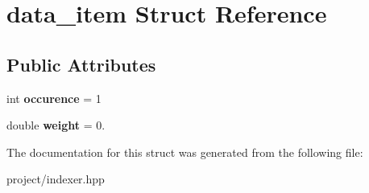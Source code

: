 \hypertarget{structdata__item}{}\section{data\+\_\+item Struct Reference}
\label{structdata__item}
\subsection*{Public Attributes}
\begin{DoxyCompactItemize}
\item 
\mbox{\label{structdata__item_a5baada4feb869f7d78c8308e3a0def26}} 
int {\bfseries occurence} = 1
\item 
\mbox{\label{structdata__item_a06432e7052735903f2b91cab7d035790}} 
double {\bfseries weight} = 0.
\end{DoxyCompactItemize}


The documentation for this struct was generated from the following file\+:\begin{DoxyCompactItemize}
\item 
project/indexer.\+hpp\end{DoxyCompactItemize}
